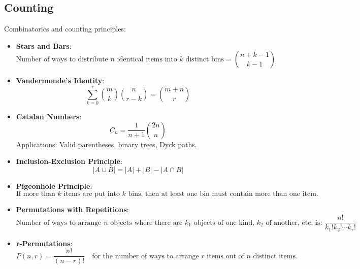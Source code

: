 \subsection{Counting}
Combinatorics and counting principles:

\begin{itemize}
    \item \textbf{Stars and Bars}:
        \[
        \text{Number of ways to distribute } n \text{ identical items into } k \text{ distinct bins} = \binom{n + k - 1}{k - 1}
        \]
    \item \textbf{Vandermonde's Identity}:
        \[
        \sum_{k=0}^r \binom{m}{k} \binom{n}{r - k} = \binom{m + n}{r}
        \]
    \item \textbf{Catalan Numbers}:
        \[
        C_n = \frac{1}{n + 1} \binom{2n}{n}
        \]
        Applications: Valid parentheses, binary trees, Dyck paths.
    \item \textbf{Inclusion-Exclusion Principle}:
        \[
        |A \cup B| = |A| + |B| - |A \cap B|
        \]
    \item \textbf{Pigeonhole Principle}:
        \[
        \text{If more than } k \text{ items are put into } k \text{ bins, then at least one bin must contain more than one item.}
        \]
    \item \textbf{Permutations with Repetitions}:
        \[
        \text{Number of ways to arrange } n \text{ objects where there are } k_1 \text{ objects of one kind, } k_2 \text{ of another, etc. is: } \frac{n!}{k_1!k_2! \cdots k_r!}
        \]
    \item \textbf{r-Permutations}:
        \[
        P(n, r) = \frac{n!}{(n - r)!} \quad \text{for the number of ways to arrange } r \text{ items out of } n \text{ distinct items}.
        \]
\end{itemize}
